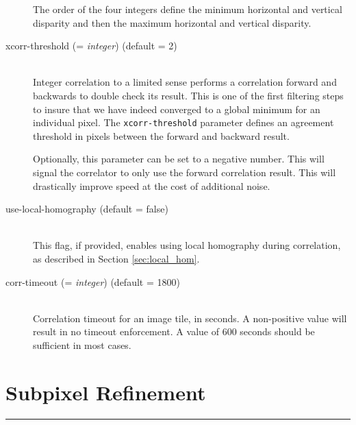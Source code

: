 \begin{description}
  The order of the four integers define the minimum horizontal and
  vertical disparity and then the maximum horizontal and vertical
  disparity.

\item[xcorr-threshold \textnormal{\small{(= \emph{integer})}} (default = 2)] \hfill \\

  Integer correlation to a limited sense performs a correlation
  forward and backwards to double check its result. This is one of the
  first filtering steps to insure that we have indeed converged to a
  global minimum for an individual pixel. The \texttt{xcorr-threshold}
  parameter defines an agreement threshold in pixels between the
  forward and backward result.

  Optionally, this parameter can be set to a negative number. This
  will signal the correlator to only use the forward correlation
  result. This will drastically improve speed at the cost of
  additional noise.

\item[use-local-homography \textnormal (default = false)] \hfill \\

  This flag, if provided, enables using local homography during
  correlation, as described in Section \ref{sec:local_hom}.

\item[corr-timeout \textnormal{\small{(= \emph{integer})}} (default = 1800)]\hfill \\

  Correlation timeout for an image tile, in seconds. A non-positive
value will result in no timeout enforcement. A value of 600 seconds
should be sufficient in most cases.

\end{description}

\section{Subpixel Refinement}
\hrule
\bigskip

